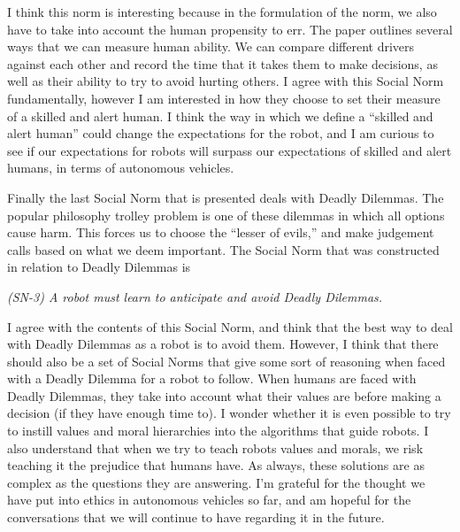 \documentclass{article}
\begin{document}
\bigskip

I think this norm is interesting because in the formulation of the norm, we also have to take into account the human propensity to err. The paper outlines several ways that we can measure human ability. We can compare different drivers against each other and record the time that it takes them to make decisions, as well as their ability to try to avoid hurting others. I agree with this Social Norm fundamentally, however I am interested in how they choose to set their measure of a skilled and alert human. I think the way in which we define a “skilled and alert human” could change the expectations for the robot, and I am curious to see if our expectations for robots will surpass our expectations of skilled and alert humans, in terms of autonomous vehicles.
 
\bigskip
 
Finally the last Social Norm that is presented deals with Deadly Dilemmas. The popular philosophy trolley problem is one of these dilemmas in which all options cause harm. This forces us to choose the “lesser of evils,” and make judgement calls based on what we deem important. The Social Norm that was constructed in relation to Deadly Dilemmas is

\bigskip

{\it (SN-3) A robot must learn to anticipate and avoid Deadly Dilemmas.} 

\bigskip

I agree with the contents of this Social Norm, and think that the best way to deal with Deadly Dilemmas as a robot is to avoid them. However, I think that there should also be a set of Social Norms that give some sort of reasoning when faced with a Deadly Dilemma for a robot to follow. When humans are faced with Deadly Dilemmas, they take into account what their values are before making a decision (if they have enough time to). I wonder whether it is even possible to try to instill values and moral hierarchies into the algorithms that guide robots. I also understand that when we try to teach robots values and morals, we risk teaching it the prejudice that humans have. As always, these solutions are as complex as the questions they are answering. I’m grateful for the thought we have put into ethics in autonomous vehicles so far, and am hopeful for the conversations that we will continue to have regarding it in the future.
\end{document}
